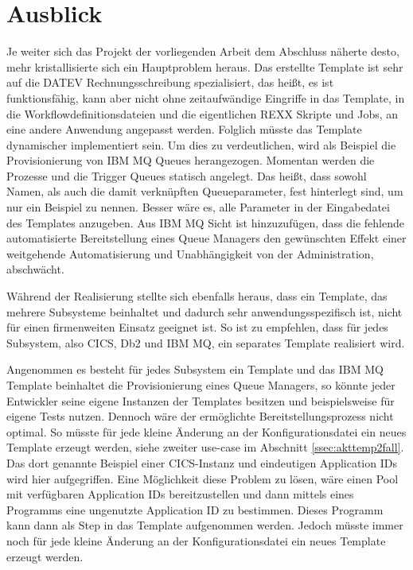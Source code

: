 \chapter{Ausblick}\label{ch:ausblick}
Je weiter sich das Projekt der vorliegenden Arbeit dem Abschluss näherte desto, mehr kristallisierte sich ein Hauptproblem heraus.
Das erstellte Template ist sehr auf die DATEV Rechnungsschreibung spezialisiert, das heißt, es ist funktionsfähig, kann aber nicht ohne zeitaufwändige Eingriffe in das Template, in die Workflowdefinitionsdateien und die eigentlichen REXX Skripte und Jobs, an eine andere Anwendung angepasst werden. 
Folglich müsste das Template dynamischer implementiert sein.
Um dies zu verdeutlichen, wird als Beispiel die Provisionierung von IBM MQ Queues herangezogen.
Momentan werden die Prozesse und die Trigger Queues statisch angelegt.
Das heißt, dass sowohl Namen, als auch die damit verknüpften Queueparameter, fest hinterlegt sind, um nur ein Beispiel zu nennen.
Besser wäre es, alle Parameter in der Eingabedatei des Templates anzugeben.
Aus IBM MQ Sicht ist hinzuzufügen, dass die fehlende automatisierte Bereitstellung eines Queue Managers den gewünschten Effekt einer weitgehende Automatisierung und Unabhängigkeit von der Administration, abschwächt.

Während der Realisierung stellte sich ebenfalls heraus, dass ein Template, das mehrere Subsysteme beinhaltet und dadurch sehr anwendungsspezifisch ist, nicht für einen firmenweiten Einsatz geeignet ist.
So ist zu empfehlen, dass für jedes Subsystem, also CICS, Db2 und IBM MQ, ein separates Template realisiert wird.

Angenommen es besteht für jedes Subsystem ein Template und das IBM MQ Template beinhaltet die Provisionierung eines Queue Managers, so könnte jeder Entwickler seine eigene Instanzen der Templates besitzen und beispielsweise für eigene Tests nutzen.
Dennoch wäre der ermöglichte Bereitstellungsprozess nicht optimal.
So müsste für jede kleine Änderung an der Konfigurationsdatei ein neues Template erzeugt werden, siehe zweiter use-case im Abschnitt \ref{ssec:akttemp2fall}.
Das dort genannte Beispiel einer CICS-Instanz und eindeutigen Application IDs wird hier aufgegriffen.
Eine Möglichkeit diese Problem zu lösen, wäre einen Pool mit verfügbaren Application IDs bereitzustellen und dann mittels eines Programms eine ungenutzte Application ID zu bestimmen.
Dieses Programm kann dann als Step in das Template aufgenommen werden.
Jedoch müsste immer noch für jede kleine Änderung an der Konfigurationsdatei ein neues Template erzeugt werden.

